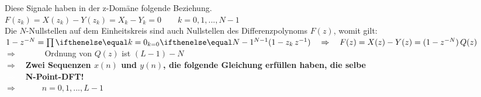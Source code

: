 \begin{itemize}
		 Diese Signale haben in der z-Domäne folgende Beziehung.\\[0.2cm]
		 $F(z_k) = X(z_k) - Y(z_k) = X_k - Y_k = 0\qquad k=0,1,...,N-1$\\[0.2cm]
		 Die $N$-Nullstellen auf dem Einheitskreis sind auch Nullstellen des Differenzpolynoms $F(z)$, womit gilt:\\[0.1cm]
		 $1-z^{-N} = \myprod{k=0}{N-1}{(1-z_k\,z^{-1})}\quad\Rightarrow\quad F(z) = X(z)-Y(z) = (1-z^{-N})\,Q(z)$\\[0.2cm]
		 $\Rightarrow\quad$$\qquad$ Ordnung von $Q(z)$ ist $(L-1)-N$\\[0.2cm]
		 $\Rightarrow\quad$\textbf{Zwei Sequenzen $x(n)$ und $y(n)$, die folgende Gleichung erfüllen haben, die selbe}\\  
		 \textcolor{white}{$\Rightarrow\quad$}\textbf{N-Point-DFT!}\\[0.2cm]
		 $\Rightarrow\quad$$\qquad n=0,1,...,L-1$
		\end{itemize}$ $\\[-1cm]

